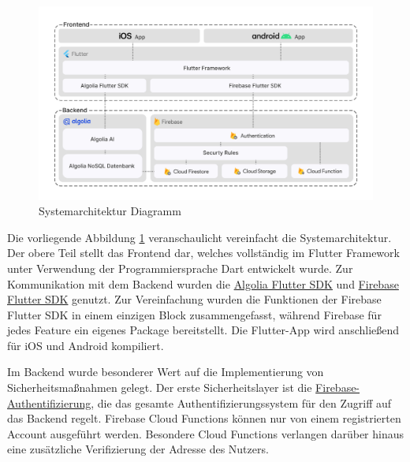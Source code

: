 
\begin{figure}[h]
    \centering
    \includegraphics[width=1\textwidth]{pics/systemarchitektur_diagram.png}
    \caption{Systemarchitektur Diagramm}
    \label{fig:systemarchitektur}
\end{figure}

% 
Die vorliegende Abbildung \ref{fig:systemarchitektur}
veranschaulicht vereinfacht die Systemarchitektur. Der
obere Teil stellt das Frontend dar, welches vollständig im
Flutter Framework unter Verwendung der Programmiersprache
Dart entwickelt wurde. Zur Kommunikation mit dem Backend
wurden die \href{https://pub.dev/packages/algolia}{Algolia
    Flutter SDK} und
\href{https://pub.dev/packages/firebase}{Firebase Flutter
    SDK} genutzt. Zur Vereinfachung wurden die Funktionen der
Firebase Flutter SDK in einem einzigen Block
zusammengefasst, während Firebase für jedes Feature ein
eigenes Package bereitstellt. Die Flutter-App wird
anschließend für iOS und Android kompiliert.

Im Backend wurde besonderer Wert auf die Implementierung von
Sicherheitsmaßnahmen gelegt. Der erste Sicherheitslayer ist
die
\href{https://firebase.google.com/docs/auth}{Firebase-Authentifizierung},
die das gesamte Authentifizierungssystem für den Zugriff auf
das Backend regelt. Firebase Cloud Functions können nur von
einem registrierten Account ausgeführt werden. Besondere
Cloud Functions verlangen darüber hinaus eine zusätzliche
Verifizierung der Adresse des Nutzers.

